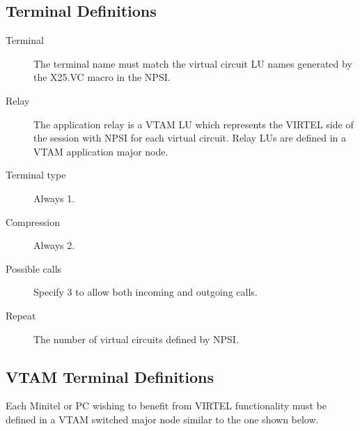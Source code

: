 \documentclass[letterpaper,10pt,english]{sphinxmanual}
\begin{document}


\subsection{Terminal Definitions}
\label{\detokenize{connectivity_guide:id29}}\label{\detokenize{connectivity_guide:index-63}}\begin{description}
\item[{Terminal}] \leavevmode
The terminal name must match the virtual circuit LU names generated by the X25.VC macro in the NPSI.

\item[{Relay}] \leavevmode
The application relay is a VTAM LU which represents the VIRTEL side of the session with NPSI for each virtual circuit. Relay LUs are defined in a VTAM application major node.

\item[{Terminal type}] \leavevmode
Always 1.

\item[{Compression}] \leavevmode
Always 2.

\item[{Possible calls}] \leavevmode
Specify 3 to allow both incoming and outgoing calls.

\item[{Repeat}] \leavevmode
The number of virtual circuits defined by NPSI.

\end{description}


\subsection{VTAM Terminal Definitions}
\label{\detokenize{connectivity_guide:index-64}}\label{\detokenize{connectivity_guide:id30}}
Each Minitel or PC wishing to benefit from VIRTEL functionality must be defined in a VTAM switched major node similar to the one shown below.
\end{document}
